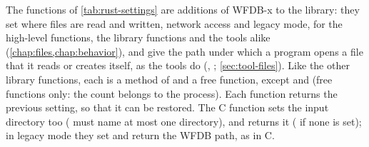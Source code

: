 The functions of \cref{tab:rust-settings} are additions of WFDB-x to the library: they
set where files are read and written, network access and legacy mode, for the
high-level functions, the library functions and the tools alike
(\cref{chap:files,chap:behavior}), and give the path under which a program opens a file
that it reads or creates itself, as the tools do (,
; \cref{sec:tool-files}). Like the other library functions,
each is a method of  and a free function, except  and
 (free functions only: the count belongs to the process).
Each  function returns the previous setting, so that it can be restored. The C
function  sets the input directory too ( must name at most one
directory), and  returns it ( if none is set); in legacy mode
they set and return the WFDB path, as in C.

